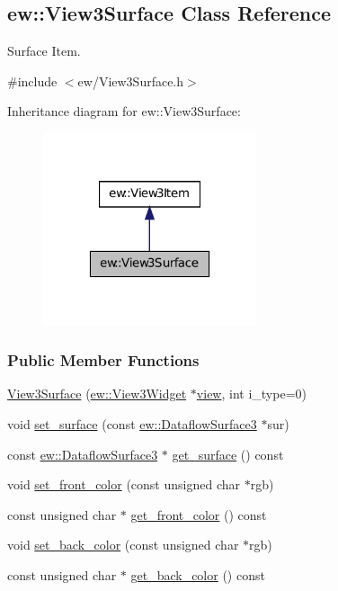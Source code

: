 \hypertarget{classew_1_1View3Surface}{
\subsection{ew::View3Surface Class Reference}
\label{classew_1_1View3Surface}
}


Surface Item.  




{\ttfamily \#include $<$ew/View3Surface.h$>$}



Inheritance diagram for ew::View3Surface:
\nopagebreak
\begin{figure}[H]
\begin{center}
\leavevmode
\includegraphics[width=178pt]{classew_1_1View3Surface__inherit__graph}
\end{center}
\end{figure}
\subsubsection*{Public Member Functions}
\begin{DoxyCompactItemize}
\item 
\hyperlink{classew_1_1View3Surface_a93b345f7747e3d073eaff2078c4cb920}{View3Surface} (\hyperlink{classew_1_1View3Widget}{ew::View3Widget} $\ast$\hyperlink{classew_1_1View3Item_a7d765842ec7b9e145cefa37e3dbae658}{view}, int i\_\-type=0)
\item 
void \hyperlink{classew_1_1View3Surface_a58f47bb37d9757ab55c40d83b67f8a68}{set\_\-surface} (const \hyperlink{classew_1_1DataflowSurface3}{ew::DataflowSurface3} $\ast$sur)
\item 
const \hyperlink{classew_1_1DataflowSurface3}{ew::DataflowSurface3} $\ast$ \hyperlink{classew_1_1View3Surface_a8821eb2ee5bd46dbd36cb18a084fa77b}{get\_\-surface} () const 
\item 
void \hyperlink{classew_1_1View3Surface_adae42c158ed8296b2953017f785f70df}{set\_\-front\_\-color} (const unsigned char $\ast$rgb)
\item 
const unsigned char $\ast$ \hyperlink{classew_1_1View3Surface_ab3c6316ff0e5489d663800aefd27e28d}{get\_\-front\_\-color} () const 
\item 
void \hyperlink{classew_1_1View3Surface_a604dbde29cdbac1eddbb474813d8ce49}{set\_\-back\_\-color} (const unsigned char $\ast$rgb)
\item 
const unsigned char $\ast$ \hyperlink{classew_1_1View3Surface_aa35528b961596719233e5c0f41cd9efb}{get\_\-back\_\-color} () const 
\end{DoxyCompactItemize}


